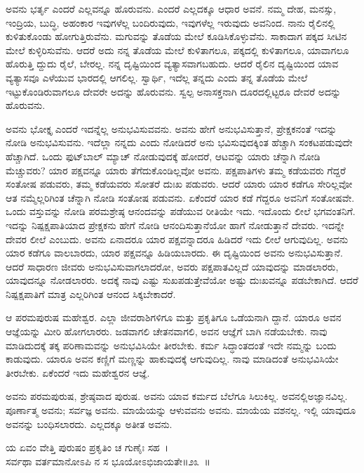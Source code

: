 ಅವನು ಭರ್ತೃ ಎಂದರೆ ಎಲ್ಲವನ್ನೂ ಹೊರುವನು. ಎಂದರೆ ಎಲ್ಲದಕ್ಕೂ ಆಧಾರ ಅವನೆ. ನಮ್ಮ ದೇಹ, ಮನಸ್ಸು, ಇಂದ್ರಿಯ, ಬುದ್ಧಿ, ಅಹಂಕಾರ ಇವುಗಳೆಲ್ಲ ಬಂದಿರುವುದು, ಇವುಗಳೆಲ್ಲ ಇರುವುದು ಅವನಿಂದ. ನಾನು ರೈಲಿನಲ್ಲಿ ಕುಳಿತುಕೊಂಡು ಹೋಗುತ್ತಿರುವೆನು. ಮಗುವನ್ನು ತೊಡೆಯ ಮೇಲೆ ಕೂಡಿಸಿಕೊಳ್ಳುವೆನು. ಸಾಕಾದಾಗ ಪಕ್ಕದ ಸೀಟಿನ ಮೇಲೆ ಕುಳ್ಳಿರಿಸುವೆನು. ಆದರೆ ಅದು ನನ್ನ ತೊಡೆಯ ಮೇಲೆ ಕುಳಿತಾಗಲೂ, ಪಕ್ಕದಲ್ಲಿ ಕುಳಿತಾಗಲೂ, ಯಾವಾಗಲೂ ಹೊರುತ್ತಿ ದ್ದುದು ರೈಲೆ, ಬೇರಲ್ಲ. ನನ್ನ ದೃಷ್ಟಿಯಿಂದ ವ್ಯತ್ಯಾಸವಾಗಬಹುದು. ಆದರೆ ರೈಲಿನ ದೃಷ್ಟಿಯಿಂದ ಯಾವ ವ್ಯತ್ಯಾಸವೂ ಎಳೆಯುವ ಭಾರದಲ್ಲಿ ಆಗಲಿಲ್ಲ. ಸ್ವಾರ್ಥಿ, ಇದೆಲ್ಲ ತನ್ನದು ಎಂದು ತನ್ನ ತೊಡೆಯ ಮೇಲೆ ಇಟ್ಟುಕೊಂಡಿರುವಾಗಲೂ ದೇವರೇ ಅದನ್ನು ಹೊರುವನು. ಸ್ವಲ್ಪ ಅನಾಸಕ್ತನಾಗಿ ದೂರದಲ್ಲಿಟ್ಟರೂ ದೇವರೆ ಅದನ್ನು ಹೊರುವನು.

ಅವನು ಭೋಕ್ತೃ ಎಂದರೆ ಇದನ್ನೆಲ್ಲ ಅನುಭವಿಸುವವನು. ಅವನು ಹೇಗೆ ಅನುಭವಿಸುತ್ತಾನೆ, ಪ್ರೇಕ್ಷಕನಂತೆ ಇದನ್ನು ನೋಡಿ ಅನುಭವಿಸುವನು. ಇದೆಲ್ಲಾ ನನ್ನದು ಎಂದು ನೋಡಿದರೆ ಅನು ಭವಿಸುವುದಕ್ಕಿಂತ ಹೆಚ್ಚಾಗಿ ಸಂಕಟಪಡುವುದೇ ಹೆಚ್ಚಾಗಿದೆ. ಒಂದು ಫುಟ್​ಬಾಲ್ ಮ್ಯಾಚ್ ನೋಡುವುದಕ್ಕೆ ಹೋದರೆ, ಆಟವನ್ನು ಯಾರು ಚೆನ್ನಾಗಿ ನೋಡಿ ಮೆಚ್ಚುವರು? ಯಾರ ಪಕ್ಷವನ್ನೂ ಯಾರು ತೆಗೆದುಕೊಂಡಿಲ್ಲವೋ ಅವನು. ಪಕ್ಷಪಾತಿಗಳು ತಮ್ಮ ಕಡೆಯವರು ಗೆದ್ದರೆ ಸಂತೋಷ ಪಡುವರು, ತಮ್ಮ ಕಡೆಯವರು ಸೋತರೆ ದುಃಖ ಪಡುವರು. ಆದರೆ ಯಾರು ಯಾರ ಕಡೆಗೂ ಸೇರಿಲ್ಲವೋ ಆತ ನಮ್ಮೆಲ್ಲರಿಗಿಂತ ಚೆನ್ನಾಗಿ ನೋಡಿ ಸಂತೋಷ ಪಡುವನು. ಏಕೆಂದರೆ ಯಾರ ಕಡೆ ಗೆದ್ದರೂ ಅವನಿಗೆ ಸಂತೋಷವೇ. ಒಂದು ವಸ್ತುವನ್ನು ನೋಡಿ ಪರಮಶ್ರೇಷ್ಠ ಆನಂದವನ್ನು ಪಡೆಯುವ ರೀತಿಯೇ ಇದು. ಇದೊಂದು ಲೀಲೆ ಭಗವಂತನಿಗೆ. ಇದನ್ನು ನಿಷ್ಪಕ್ಷಪಾತಿಯಾದ ಪ್ರೇಕ್ಷಕನು ಹೇಗೆ ನೋಡಿ ಆನಂದಿಸುತ್ತಾನೆಯೋ ಹಾಗೆ ನೋಡುತ್ತಾನೆ ದೇವರು. ಇದನ್ನೇ ದೇವರ ಲೀಲೆ ಎಂಬುದು. ಅವನು ಏನಾದರೂ ಯಾರ ಪಕ್ಷವನ್ನಾದರೂ ಹಿಡಿದರೆ ಇದು ಲೀಲೆ ಆಗುವುದಿಲ್ಲ. ಅವನು ಯಾರ ಕಡೆಗೂ ವಾಲಬಾರದು, ಯಾರ ಪಕ್ಷವನ್ನೂ ಹಿಡಿಯಬಾರದು. ಈ ದೃಷ್ಟಿಯಿಂದ ಅವನು ಅನುಭವಿಸುತ್ತಾನೆ. ಆದರೆ ಸಾಧಾರಣ ಜೀವರು ಅನುಭವಿಸುವಾಗಲಾದರೋ, ಅವರು ಪಕ್ಷಪಾತವಿಲ್ಲದೆ ಯಾವುದನ್ನು ಮಾಡಲಾರರು, ಯಾವುದನ್ನೂ ನೋಡಲಾರರು. ಅದಕ್ಕೆ ನಾವು ಎಷ್ಟು ಸುಖಪಡುತ್ತೇವೆಯೋ ಅಷ್ಟು ದುಃಖವನ್ನೂ ಪಡಬೇಕಾಗಿದೆ. ಆದರೆ ನಿಷ್ಪಕ್ಷಪಾತಿಗೆ ಮಾತ್ರ ಎಲ್ಲರಿಗಿಂತ ಆನಂದ ಸಿಕ್ಕಬೇಕಾದರೆ.

ಆ ಪರಮಪುರುಷ ಮಹೇಶ್ವರ. ಎಲ್ಲಾ ಜೀವರಾಶಿಗಳಿಗೂ ಮತ್ತು ಪ್ರಕೃತಿಗೂ ಒಡೆಯನಾಗಿ ದ್ದಾನೆ. ಯಾರೂ ಅವನ ಆಜ್ಞೆಯನ್ನು ಮೀರಿ ಹೋಗಲಾರರು. ಜಡವಾಗಲಿ ಚೇತನವಾಗಲಿ, ಅವನ ಆಜ್ಞೆಗೆ ಬಾಗಿ ನಡೆಯಬೇಕು. ನಾವು ಮಾಡಿದುದಕ್ಕೆ ತಕ್ಕ ಪರಿಣಾಮವನ್ನು ಅನುಭವಿಸಿಯೇ ತೀರಬೇಕು. ಕರ್ಮ ಸಿದ್ಧಾಂತದಂತೆ ಇದೇ ನಮ್ಮನ್ನು ಬಂದು ಕಾಡುವುದು. ಯಾರೂ ಅವನ ಕಣ್ಣಿಗೆ ಮಣ್ಣನ್ನು ಹಾಕುವುದಕ್ಕೆ ಆಗುವುದಿಲ್ಲ. ನಾವು ಮಾಡಿದಂತೆ ಅನುಭವಿಸಿಯೇ ತೀರಬೇಕು. ಏಕೆಂದರೆ ಇದು ಮಹೇಶ್ವರನ ಆಜ್ಞೆ.

ಅವನು ಪರಮಪುರುಷ, ಶ್ರೇಷ್ಠವಾದ ಪುರುಷ. ಅವನು ಯಾವ ಕರ್ಮದ ಬೆಲೆಗೂ ಸಿಲುಕಿಲ್ಲ. ಅವನಲ್ಲಿಅಜ್ಞಾನವಿಲ್ಲ. ಪೂರ್ಣಾತ್ಮ ಅವನು; ಸರ್ವಜ್ಞ ಅವನು. ಮಾಯೆಯನ್ನು ಆಳುವವನು ಅವನು. ಮಾಯೆಯ ವಶನಲ್ಲ. ಇಲ್ಲಿ ಯಾವುದೂ ಅವನನ್ನು ಬಂಧಿಸಲಾರದು. ಎಲ್ಲದಕ್ಕೂ ಅತೀತ ಅವನು.

\begin{shloka}
ಯ ಏವಂ ವೇತ್ತಿ ಪುರುಷಂ ಪ್ರಕೃತಿಂ ಚ ಗುಣೈಃ ಸಹ~।\\ಸರ್ವಥಾ ವರ್ತಮಾನೋಽಪಿ ನ ಸ ಭೂಯೋಽಭಿಜಾಯತೇ\hfill॥೨೩~॥
\end{shloka}

